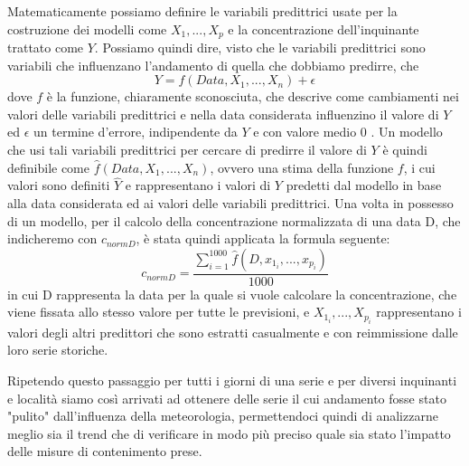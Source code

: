 \documentclass[a4paper]{report}
\begin{document}
Matematicamente possiamo definire le variabili predittrici usate per la costruzione dei modelli come $X_1,...,X_p$ e la concentrazione dell'inquinante trattato come $Y$. Possiamo quindi dire, visto che le variabili predittrici sono variabili che influenzano l'andamento di quella che dobbiamo predirre, che 
\begin{equation}
Y = f(Data, X_1,...,X_n) + \epsilon
\end{equation}
dove $f$ è la funzione, chiaramente sconosciuta, che descrive come cambiamenti nei valori delle variabili predittrici e nella data considerata influenzino il valore di $Y$ ed $\epsilon$ un termine d'errore, indipendente da $Y$ e con valore medio 0 \cite{james2013introduction}. Un modello che usi tali variabili predittrici per cercare di predirre il valore di $Y$ è quindi definibile come $\hat{f}(Data, X_1,...,X_n)$, ovvero una stima della funzione $f$, i cui valori sono definiti $\hat{Y}$ e rappresentano i valori di $Y$ predetti dal modello in base alla data considerata ed ai valori delle variabili predittrici.    
Una volta in possesso di un modello, per il calcolo della concentrazione normalizzata di una data D, che indicheremo con $c_{norm D}$, è stata quindi applicata la formula seguente:
\begin{equation}
c_{norm D} = \frac{\sum_{i=1}^{1000} \hat{f}(D, x_{1_i},...,x_{p_i})}{1000}
\end{equation}
in cui D rappresenta la data per la quale si vuole calcolare la concentrazione, che viene fissata allo stesso valore per tutte le previsioni, e $X_{1_i},...,X_{p_i}$ rappresentano i valori degli altri predittori che sono estratti casualmente e con reimmissione dalle loro serie storiche.

Ripetendo questo passaggio per tutti i giorni di una serie e per diversi inquinanti e località siamo così arrivati ad ottenere delle serie il cui andamento fosse stato "pulito" dall'influenza della meteorologia, permettendoci quindi di analizzarne meglio sia il trend che di verificare in modo più preciso quale sia stato l'impatto delle misure di contenimento prese.  
\end{document}
